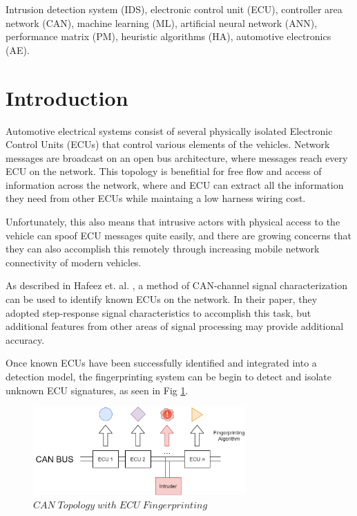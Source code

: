 \documentclass[conference]{IEEEtran}
\begin{document}
\begin{IEEEkeywords}
Intrusion detection system (IDS), electronic control unit (ECU), controller area network (CAN), machine learning (ML), artificial neural network (ANN), performance matrix (PM), heuristic algorithms (HA), automotive electronics (AE).
\end{IEEEkeywords}

\maketitle

\section{Introduction}

Automotive electrical systems consist of several physically isolated Electronic Control Units (ECUs) that control various elements of the vehicles. Network messages are broadcast on an open bus architecture, where messages reach every ECU on the network. This topology is benefitial for free flow and access of information across the network, where and ECU can extract all the information they need from other ECUs while maintaing a low harness wiring cost.

Unfortunately, this also means that intrusive actors with physical access to the vehicle can spoof ECU messages quite easily, and there are growing concerns that they can also accomplish this remotely through increasing mobile network connectivity of modern vehicles.

As described in Hafeez et. al. \cite{hafeez2019}, a method of CAN-channel signal characterization can be used to identify known ECUs on the network. In their paper, they adopted step-response signal characteristics to accomplish this task, but additional features from other areas of signal processing may provide additional accuracy.

Once known ECUs have been successfully identified and integrated into a detection model, the fingerprinting system can be begin to detect and isolate unknown ECU signatures, as seen in Fig \ref{fig:NetworkTopology}.

\begin{figure}[htb]
\centering
\includegraphics[width=3.2in]{figures/01_Fingerprinting.png}
\caption{$CAN  \; Topology  \; with  \; ECU \;  Fingerprinting$}
\label{fig:NetworkTopology}
\end{figure}
\end{document}
